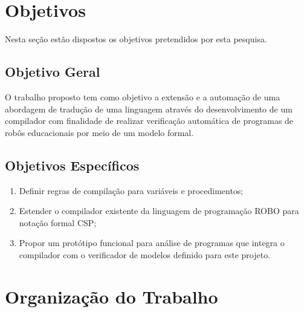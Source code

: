 \section{Objetivos}
Nesta seção estão dispostos os objetivos pretendidos por esta pesquisa.
\subsection{Objetivo Geral}

O trabalho proposto tem como objetivo a extensão e a automação de uma abordagem de tradução de uma linguagem através do desenvolvimento de um compilador com finalidade de realizar verificação automática de programas de robôs educacionais por meio de um modelo formal.

\subsection{Objetivos Específicos}

\begin{enumerate}
    \item Definir regras de compilação para variáveis e procedimentos;
    \item Estender o compilador existente da linguagem de programação ROBO para notação formal CSP;
    \item Propor um protótipo funcional para análise de programas que integra o compilador com o verificador de modelos definido para este projeto.

\end{enumerate}

\section{Organização do Trabalho}